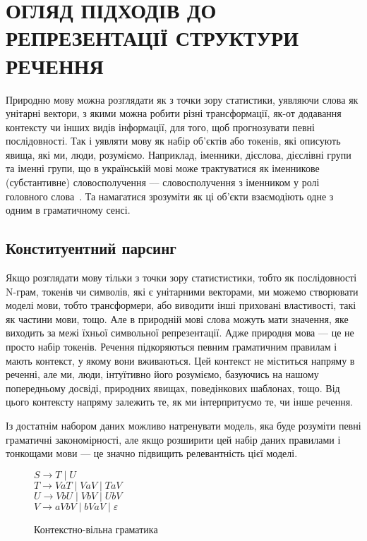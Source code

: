 \section{ОГЛЯД ПІДХОДІВ ДО РЕПРЕЗЕНТАЦІЇ СТРУКТУРИ РЕЧЕННЯ}
Природню мову можна розглядати як з точки зору статистики, уявляючи слова як унітарні вектори,
з якими можна робити різні трансформації, як-от додавання контексту чи інших видів
інформації, для того, щоб прогнозувати певні послідовності. Так і уявляти мову як
набір об'єктів або токенів, які описують явища, які ми, люди, розуміємо. Наприклад,
іменники, дієслова, дієслівні групи та іменні групи, що в українській мові
може трактуватися як іменникове (субстантивне) словосполучення –-- словосполучення 
з іменником у ролі головного слова~\cite{bib3}. Та намагатися зрозуміти як
ці об'єкти взаємодіють одне з одним в граматичному сенсі.

\subsection{Конституентний парсинг}
Якщо розглядати мову тільки з точки зору статистистики, тобто як послідовності N-грам, токенів
чи символів, які є унітарними векторами, ми можемо створювати моделі мови, тобто трансформери,
або виводити інші приховані властивості, такі як частини мови, тощо. Але в природній мові слова
можуть мати значення, яке виходить за межі їхньої символьної репрезентації. Адже природня
мова --- це не просто набір токенів. Речення підкоряються певним граматичним правилам і мають
контекст, у якому вони вживаються. Цей контекст не міститься напряму в реченні, але ми, люди,
інтуїтивно його розуміємо, базуючись на нашому попередньому досвіді, природних явищах, поведінкових
шаблонах, тощо. Від цього контексту напряму залежить те, як ми інтерпритуємо те, чи інше речення.

Із достатнім набором даних можливо натренувати модель, яка буде розуміти певні граматичні
закономірності, але якщо розширити цей набір даних правилами і тонкощами мови --- це значно підвищить релевантність цієї моделі.

\begin{wrapfigure}{r}{0.35\textwidth}
  \begin{center}
    \noindent $S \rightarrow T \mid U$ \\
    \noindent $T \rightarrow VaT \mid VaV \mid TaV$ \\
    \noindent $U \rightarrow VbU \mid VbV \mid UbV$ \\
    \noindent $V \rightarrow aVbV \mid bVaV \mid \varepsilon$ \\
  \end{center}
  \caption{Контекстно-вільна граматика}
  \label{text:context_free_grammar}
\end{wrapfigure}

